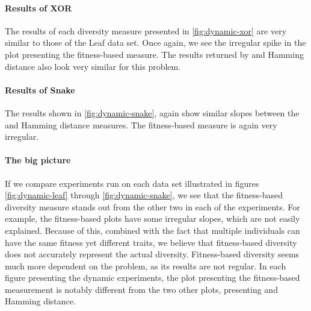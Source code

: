 

\paragraph{Results of XOR} The results of each diversity measure presented in \cref{fig:dynamic-xor} are very similar to those of the Leaf data set. Once again, we see the irregular spike in the plot presenting the fitness-based measure. The results returned by \dia{} and Hamming distance also look very similar for this problem.%



\paragraph{Results of Snake} The results shown in \cref{fig:dynamic-snake}, again show similar slopes between the \dia{} and Hamming distance measures. The fitness-based measure is again very irregular.



\paragraph{The big picture} If we compare experiments run on each data set illustrated in figures \ref{fig:dynamic-leaf} through \ref{fig:dynamic-snake}, we see that the fitness-based diversity measure stands out from the other two in each of the experiments. For example, the fitness-based plots have some irregular slopes, which are not easily explained. Because of this, combined with the fact that multiple individuals can have the same fitness yet different traits, we believe that fitness-based diversity does not accurately represent the actual diversity. Fitness-based diversity seems much more dependent on the problem, as its results are not regular. In each figure presenting the dynamic experiments, the plot presenting the fitness-based measurement is notably different from the two other plots, presenting \dia{} and Hamming distance.


